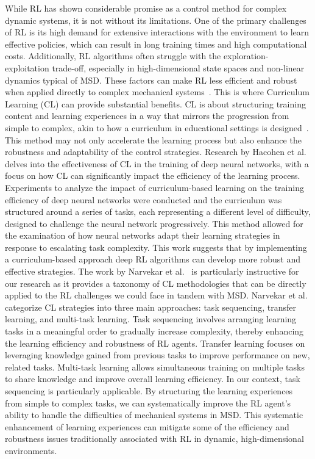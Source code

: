 While RL has shown considerable promise as a control method for complex dynamic systems, it is not without its limitations. One of the primary challenges of RL is its high demand for extensive interactions with the environment to learn effective policies, which can result in long training times and high computational costs. Additionally, RL algorithms often struggle with the exploration-exploitation trade-off, especially in high-dimensional state spaces and non-linear dynamics typical of MSD. These factors can make RL less efficient and robust when applied directly to complex mechanical systems~\cite{dulac2019challenges}.
This is where Curriculum Learning (CL) can provide substantial benefits. CL is about structuring training content and learning experiences in a way that mirrors the progression from simple to complex, akin to how a curriculum in educational settings is designed~\cite{bengio2009cl}. This method may not only accelerate the learning process but also enhance the robustness and adaptability of the control strategies.
Research by Hacohen et al.~\cite{hacohen2019clnetworks} delves into the effectiveness of CL in the training of deep neural networks, with a focus on how CL can significantly impact the efficiency of the learning process. Experiments to analyze the impact of curriculum-based learning on the training efficiency of deep neural networks were conducted and the curriculum was structured around a series of tasks, each representing a different level of difficulty, designed to challenge the neural network progressively. This method allowed for the examination of how neural networks adapt their learning strategies in response to escalating task complexity. This work suggests that by implementing a curriculum-based approach deep RL algorithms can develop more robust and effective strategies. 
The work by Narvekar et al.~\cite{narvekar2020survey} is particularly instructive for our research as it provides a taxonomy of CL methodologies that can be directly applied to the RL challenges we could face in tandem with MSD. Narvekar et al. categorize CL strategies into three main approaches: task sequencing, transfer learning, and multi-task learning. Task sequencing involves arranging learning tasks in a meaningful order to gradually increase complexity, thereby enhancing the learning efficiency and robustness of RL agents. Transfer learning focuses on leveraging knowledge gained from previous tasks to improve performance on new, related tasks. Multi-task learning allows simultaneous training on multiple tasks to share knowledge and improve overall learning efficiency. In our context, task sequencing is particularly applicable. By structuring the learning experiences from simple to complex tasks, we can systematically improve the RL agent's ability to handle the difficulties of mechanical systems in MSD. This systematic enhancement of learning experiences can mitigate some of the efficiency and robustness issues traditionally associated with RL in dynamic, high-dimensional environments.
